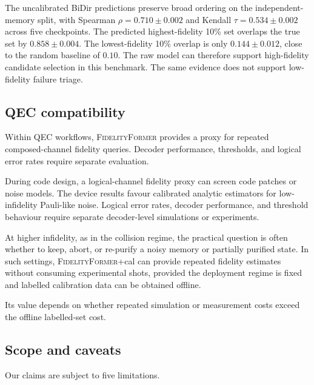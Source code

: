 \documentclass[12pt]{iopart}
\newcommand{\fidno}{\textsc{FidelityFormer}}
\begin{document}
The uncalibrated BiDir predictions preserve broad ordering on the independent-memory split, with Spearman $\rho=0.710\pm0.002$ and Kendall $\tau=0.534\pm0.002$ across five checkpoints. The predicted highest-fidelity 10\% set overlaps the true set by $0.858\pm0.004$. The lowest-fidelity 10\% overlap is only $0.144\pm0.012$, close to the random baseline of $0.10$. The raw model can therefore support high-fidelity candidate selection in this benchmark. The same evidence does not support low-fidelity failure triage.

\subsection{QEC compatibility}

Within QEC workflows, \fidno{} provides a proxy for repeated composed-channel fidelity queries. Decoder performance, thresholds, and logical error rates require separate evaluation.

\begin{description}[itemsep=2pt,topsep=2pt,leftmargin=*]
\item[Logical-channel quality estimation.]
During code design, a logical-channel fidelity proxy can screen code patches or noise models. The device results favour calibrated analytic estimators for low-infidelity Pauli-like noise. Logical error rates, decoder performance, and threshold behaviour require separate decoder-level simulations or experiments.

\item[Memory cutoff and protocol selection.]
At higher infidelity, as in the collision regime, the practical question is often whether to keep, abort, or re-purify a noisy memory or partially purified state. In such settings, \fidno{}+cal can provide repeated fidelity estimates without consuming experimental shots, provided the deployment regime is fixed and labelled calibration data can be obtained offline.
\end{description}

Its value depends on whether repeated simulation or measurement costs exceed the offline labelled-set cost.

\subsection{Scope and caveats}

Our claims are subject to five limitations.
\end{document}
